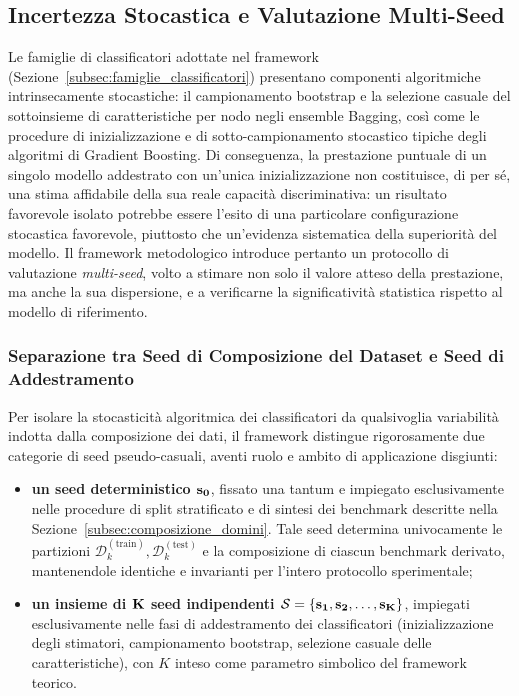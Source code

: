 \subsection{Incertezza Stocastica e Valutazione Multi-Seed}
\label{subsec:stabilita_stocastica}

Le famiglie di classificatori adottate nel framework (Sezione~\ref{subsec:famiglie_classificatori}) presentano componenti algoritmiche intrinsecamente stocastiche: il campionamento bootstrap e la selezione casuale del sottoinsieme di caratteristiche per nodo negli ensemble Bagging, così come le procedure di inizializzazione e di sotto-campionamento stocastico tipiche degli algoritmi di Gradient Boosting. Di conseguenza, la prestazione puntuale di un singolo modello addestrato con un'unica inizializzazione non costituisce, di per sé, una stima affidabile della sua reale capacità discriminativa: un risultato favorevole isolato potrebbe essere l'esito di una particolare configurazione stocastica favorevole, piuttosto che un'evidenza sistematica della superiorità del modello. Il framework metodologico introduce pertanto un protocollo di valutazione \textit{multi-seed}, volto a stimare non solo il valore atteso della prestazione, ma anche la sua dispersione, e a verificarne la significatività statistica rispetto al modello di riferimento.

\subsubsection{Separazione tra Seed di Composizione del Dataset e Seed di Addestramento}
\label{subsubsec:seed_separation}
Per isolare la stocasticità algoritmica dei classificatori da qualsivoglia variabilità indotta dalla composizione dei dati, il framework distingue rigorosamente due categorie di seed pseudo-casuali, aventi ruolo e ambito di applicazione disgiunti:
\begin{itemize}
    \item \textbf{un seed deterministico $\bf{s_0}$}, fissato una tantum e impiegato esclusivamente nelle procedure di split stratificato e di sintesi dei benchmark descritte nella Sezione~\ref{subsec:composizione_domini}. Tale seed determina univocamente le partizioni $\mathcal{D}_k^{(\text{train})}, \mathcal{D}_k^{(\text{test})}$ e la composizione di ciascun benchmark derivato, mantenendole identiche e invarianti per l'intero protocollo sperimentale;
    \item \textbf{un insieme di $\bf{K}$ seed indipendenti $\bf{\mathcal{S} = \{s_1, s_2, \dots, s_K\}}$}, impiegati esclusivamente nelle fasi di addestramento dei classificatori (inizializzazione degli stimatori, campionamento bootstrap, selezione casuale delle caratteristiche), con $K$ inteso come parametro simbolico del framework teorico.
\end{itemize}

